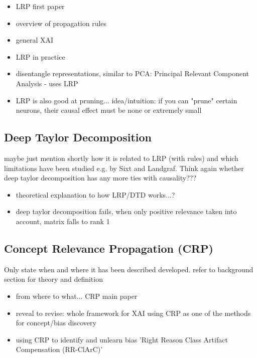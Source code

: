 \begin{itemize}
      \item LRP first paper \cite{Bach2015}
      \item overview of propagation rules \cite{Montavon2019}
      \item general XAI \cite{Samek2021}
      \item LRP in practice \cite{Kohlbrenner2020}
      \item disentangle representations, similar to PCA: Principal Relevant Component Analysis - uses LRP \cite{Chormai2022}
      \item LRP is also good at pruning... idea/intuition: if you can "prune" certain neurons, their causal effect must be none or extremely small \cite{Yeom2019}
\end{itemize}

\subsection{Deep Taylor Decomposition}
{\color{red} maybe just mention shortly how it is related to LRP (with rules) and which limitations have been studied e.g. by Sixt and Landgraf. Think again whether deep taylor decomposition has any more ties with causality???}

\begin{itemize}
      \item theoretical explanation to how LRP/DTD works...? \cite{Montavon2017}
      \item deep taylor decomposition fails, when only positive relevance taken into account, matrix falls to rank 1 \cite{Sixt2022}
\end{itemize}

\subsection{Concept Relevance Propagation (CRP)}
{\color{red} Only state when and where it has been described developed. refer to background section for theory and definition}

\begin{itemize}
      \item from where to what... CRP main paper \cite{Achtibat2022}
      \item reveal to revise: whole framework for XAI using CRP as one of the methods for concept/bias discovery \cite{Pahde2023}
      \item using CRP to identify and unlearn bias 'Right Reason Class Artifact Compensation (RR-ClArC)' \cite{Dreyer2023a}
\end{itemize}

